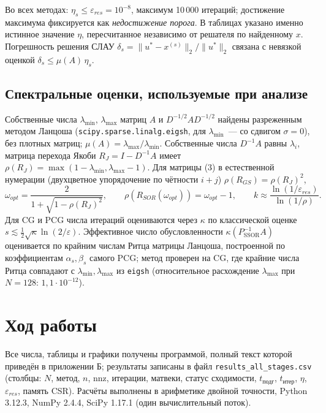 \documentclass[12pt]{article}
\begin{document}
Во всех методах: $\eta_s\le\varepsilon_{res}=10^{-8}$, максимум 10\,000 итераций; достижение максимума фиксируется как \emph{недостижение порога}. В таблицах указано именно истинное значение $\eta$, пересчитанное независимо от решателя по найденному $x$. Погрешность решения СЛАУ $\delta_s=\|u^*-x^{(s)}\|_2/\|u^*\|_2$ связана с невязкой оценкой $\delta_s\le\mu(A)\,\eta_s$.\par

\subsection{Спектральные оценки, используемые при анализе}

Собственные числа $\lambda_{\min}$, $\lambda_{\max}$ матриц $A$ и $D^{-1/2}AD^{-1/2}$ найдены разреженным методом Ланцоша (\texttt{scipy.sparse.linalg.eigsh}, для $\lambda_{\min}$~--- со сдвигом $\sigma=0$), без плотных матриц; $\mu(A)=\lambda_{\max}/\lambda_{\min}$. Собственные числа $D^{-1}A$ равны $\lambda_i$, матрица перехода Якоби $R_J=I-D^{-1}A$ имеет $\rho(R_J)=\max(1-\lambda_{\min},\lambda_{\max}-1)$. Для матрицы (3) в естественной нумерации (двухцветное упорядочение по чётности $i+j$) $\rho(R_{GS})=\rho(R_J)^2$,
\[
\omega_{opt}=\frac{2}{1+\sqrt{1-\rho(R_J)^2}},\qquad \rho(R_{SOR}(\omega_{opt}))=\omega_{opt}-1,\qquad k\approx\frac{\ln(1/\varepsilon_{res})}{\ln(1/\rho)}.
\]
Для CG и PCG числа итераций оцениваются через $\kappa$ по классической оценке $s\lesssim\frac12\sqrt{\kappa}\ln(2/\varepsilon)$. Эффективное число обусловленности $\kappa(P_\text{SSOR}^{-1}A)$ оценивается по крайним числам Ритца матрицы Ланцоша, построенной по коэффициентам $\alpha_s,\beta_s$ самого PCG; метод проверен на CG, где крайние числа Ритца совпадают с $\lambda_{\min},\lambda_{\max}$ из \texttt{eigsh} (относительное расхождение $\lambda_{\max}$ при $N=128$: $1{,}1\cdot10^{-12}$).\par

\section{Ход работы}

Все числа, таблицы и графики получены программой, полный текст которой приведён в приложении Б; результаты записаны в файл \texttt{results\_all\_stages.csv} (столбцы: $N$, метод, $n$, nnz, итерации, матвеки, статус сходимости, $t_\text{подг}$, $t_\text{итер}$, $\eta$, $\varepsilon_{res}$, память CSR). Расчёты выполнены в арифметике двойной точности, Python 3.12.3, NumPy 2.4.4, SciPy 1.17.1 (один вычислительный поток).
\end{document}
